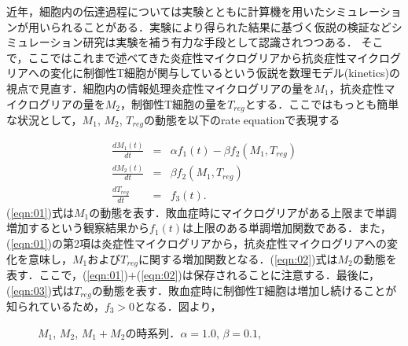 \documentclass{jsarticle}
\begin{document}
近年，細胞内の伝達過程については実験とともに計算機を用いたシミュレーションが用いられることがある．実験により得られた結果に基づく仮説の検証などシミュレーション研究は実験を補う有力な手段として認識されつつある．
そこで，ここではこれまで述べてきた炎症性マイクログリアから抗炎症性マイクログリアへの変化に制御性T細胞が関与しているという仮説を数理モデル(kinetics)の視点で見直す．細胞内の情報処理炎症性マイクログリアの量を$M_1$，抗炎症性マイクログリアの量を$M_2$，制御性T細胞の量を$T_{reg}$とする．ここではもっとも簡単な状況として，$M_1$, $M_2$, $T_{reg}$の動態を以下のrate equationで表現する

\begin{eqnarray}
  \label{eqn:01}
  \frac{dM_{1}(t)}{dt} &=& \alpha f_1(t)- \beta f_2(M_1, T_{reg}) \\
  \label{eqn:02}
  \frac{dM_2(t)}{dt} &=& \beta f_2(M_1, T_{reg}) \\
  \label{eqn:03}
  \frac{dT_{reg}}{dt} &=& f_3(t).
\end{eqnarray}
(\ref{eqn:01})式は$M_1$の動態を表す．敗血症時にマイクログリアがある上限まで単調増加するという観察結果から$f_1(t)$は上限のある単調増加関数である．また，(\ref{eqn:01})の第2項は炎症性マイクログリアから，抗炎症性マイクログリアへの変化を意味し，$M_1$および$T_{reg}$に関する増加関数となる．(\ref{eqn:02})式は$M_2$の動態を表す．ここで，(\ref{eqn:01})$+$(\ref{eqn:02})は保存されることに注意する．最後に，(\ref{eqn:03})式は$T_{reg}$の動態を表す．敗血症時に制御性T細胞は増加し続けることが知られているため，$f_3>0$となる．図より，

\begin{figure}[h]
  \centering
      \caption{$M_1$, $M_2$, $M_1+M_2$の時系列．$\alpha=1.0$, $\beta=0.1$, }
      \label{fig:01}
  \end{figure}
\end{document}
